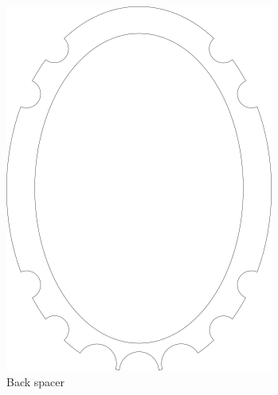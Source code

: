 \documentclass{article}
\begin{document}
\begin{figure}
\begin{subfigure}[b]{0.24\textwidth}
        \includegraphics[width=\textwidth]{images/spacer_back.png}
        \caption{Back spacer}
        \label{f:driver:spacer_back}
    \end{subfigure}
    \begin{subfigure}[b]{0.24\textwidth}

\end{subfigure}
\end{figure}
\end{document}
